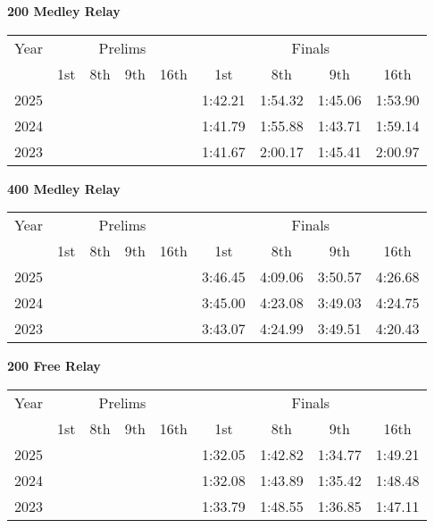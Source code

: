 \clearpage
\textbf{200 Medley Relay}

\begin{flushleft}
\begin{tabular}{|c|c|c|c|c|c|c|c|c|}
\hline
Year & \multicolumn{4}{c|}{Prelims} & \multicolumn{4}{c|}{Finals} \\
\cline{2-9}
& 1st & 8th & 9th & 16th & 1st & 8th & 9th & 16th \\
\hline
2025 &  &  &  &  & 1:42.21 & 1:54.32 & 1:45.06 & 1:53.90 \\
2024 &  &  &  &  & 1:41.79 & 1:55.88 & 1:43.71 & 1:59.14 \\
2023 &  &  &  &  & 1:41.67 & 2:00.17 & 1:45.41 & 2:00.97 \\
\hline
\end{tabular}
\end{flushleft}

\textbf{400 Medley Relay}

\begin{flushleft}
\begin{tabular}{|c|c|c|c|c|c|c|c|c|}
\hline
Year & \multicolumn{4}{c|}{Prelims} & \multicolumn{4}{c|}{Finals} \\
\cline{2-9}
& 1st & 8th & 9th & 16th & 1st & 8th & 9th & 16th \\
\hline
2025 &  &  &  &  & 3:46.45 & 4:09.06 & 3:50.57 & 4:26.68 \\
2024 &  &  &  &  & 3:45.00 & 4:23.08 & 3:49.03 & 4:24.75 \\
2023 &  &  &  &  & 3:43.07 & 4:24.99 & 3:49.51 & 4:20.43 \\
\hline
\end{tabular}
\end{flushleft}

\textbf{200 Free Relay}

\begin{flushleft}
\begin{tabular}{|c|c|c|c|c|c|c|c|c|}
\hline
Year & \multicolumn{4}{c|}{Prelims} & \multicolumn{4}{c|}{Finals} \\
\cline{2-9}
& 1st & 8th & 9th & 16th & 1st & 8th & 9th & 16th \\
\hline
2025 &  &  &  &  & 1:32.05 & 1:42.82 & 1:34.77 & 1:49.21 \\
2024 &  &  &  &  & 1:32.08 & 1:43.89 & 1:35.42 & 1:48.48 \\
2023 &  &  &  &  & 1:33.79 & 1:48.55 & 1:36.85 & 1:47.11 \\
\hline
\end{tabular}
\end{flushleft}

